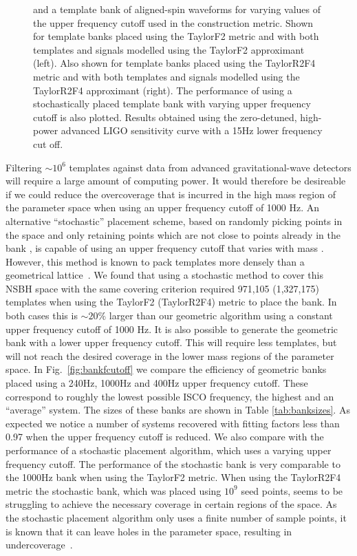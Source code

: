 \begin{figure}
\begin{minipage}[l]{\columnwidth}
{and a template bank of aligned-spin waveforms for varying values of the upper
frequency cutoff used in the construction metric. Shown for template banks
placed using the TaylorF2 metric and with both templates and signals 
modelled using the TaylorF2 approximant (left). Also shown for template banks
placed using the TaylorR2F4 metric and with both templates and signals 
modelled using the TaylorR2F4 approximant (right). The
performance of using a stochastically placed template bank with varying upper
frequency cutoff is also plotted. Results obtained
using the zero-detuned, high-power advanced LIGO sensitivity curve with a 15Hz
lower frequency cut off.
}
\end{minipage}
\end{figure}

Filtering ${\sim}10^6$ templates against data from advanced
gravitational-wave detectors will require a large amount of computing power. It
would therefore be desireable if we could reduce the overcoverage that
is incurred in the high mass region of the parameter space when using an upper
frequency cutoff of 1000 Hz. An alternative ``stochastic'' placement scheme,
based on randomly picking points in the space and only retaining points which
are not close to points already in the bank
\cite{Harry:2009ea,Babak:2008rb,Manca:2009xw}, is capable of using an upper
frequency cutoff that varies with mass \cite{Ajith:2012mn}. However, this
method is known to pack templates more densely than a geometrical
lattice~\cite{Harry:2009ea}.
We found that using a stochastic method to cover this \ac{NSBH} space with the
same covering criterion required 971,105 (1,327,175) templates when using
the TaylorF2 (TaylorR2F4) metric to place the bank. In both cases this is $\sim
20\%$ larger than our geometric algorithm using a constant upper frequency
cutoff of 1000 Hz. It is also possible to generate the geometric bank with a
lower upper frequency cutoff. This will require less
templates, but will not reach the desired coverage in the lower mass regions of
the parameter space. In Fig.~\ref{fig:bankfcutoff} we compare the efficiency
of geometric banks placed using a 240Hz, 1000Hz and 400Hz upper frequency
cutoff. These correspond to roughly the lowest possible \ac{ISCO}
frequency, the highest and an ``average'' system. The sizes of these banks are
shown in Table \ref{tab:banksizes}. As expected we notice a number of systems
recovered with fitting factors less than 0.97 when the upper frequency cutoff is
reduced. We also compare with the performance of a
stochastic placement algorithm, which uses a varying upper frequency cutoff.
The performance of the
stochastic bank is very comparable to the 1000Hz bank when using the TaylorF2
metric. When using the TaylorR2F4 metric  the stochastic bank, which was placed
using $10^9$ seed points, seems to be struggling to achieve the necessary
coverage in certain regions of the space. As the stochastic placement algorithm
only uses a finite number of sample points, it is known that it can leave holes
in the parameter space, resulting in undercoverage~\cite{Harry:2009ea}.


